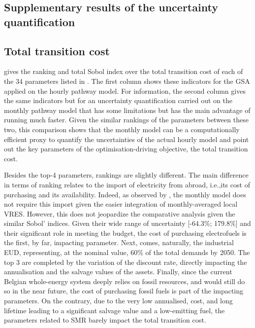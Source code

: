 \documentclass[11pt,twoside,a4paper,english]{article}
\def\ie{i.e.,}
\begin{document}
\begin{appendices}
\section{Supplementary results of the uncertainty quantification}

\subsection{Total transition cost}
\label{app:UQ_transition_cost}

 gives the ranking and total Sobol index over the total transition cost of each of the 34 parameters listed in . The first column shows these indicators for the \gls{GSA} applied on the hourly pathway model. For information, the second column gives the same indicators but for an uncertainty quantification carried out on the monthly pathway model that has some limitations \cite{limpens2024pathway} but has the main advantage of running much faster. Given the similar rankings of the parameters between these two, this comparison shows that the monthly model can be a computationally efficient proxy to quantify the uncertainties of the actual hourly model and point out the key parameters of the optimisation-driving objective, the total transition cost. 

Besides the top-4 parameters, rankings are slightly different. The main difference in terms of ranking relates to the import of electricity from abroad, \ie its cost of purchasing and its availability. Indeed, as observed by \citet{limpens2024pathway}, the monthly model does not require this import given the easier integration of monthly-averaged local \gls{VRES}. However, this does not jeopardize the comparative analysis given the similar Sobol' indices. Given their wide range of uncertainty [-64.3\%; 179.8\%] and their significant role in meeting the  budget, the cost of purchasing electrofuels is the first, by far, impacting parameter. Next, comes, naturally, the industrial \gls{EUD}, representing, at the nominal value, 60\% of the total demands by 2050. The top 3 are completed by the variation of the discount rate, directly impacting the annualisation and the salvage values of the assets. Finally, since the current Belgian whole-energy system deeply relies on fossil resources, and would still do so in the near future, the cost of purchasing fossil fuels is part of the impacting parameters. On the contrary, due to the very low annualised, cost, and long lifetime leading to a significant salvage value and a low-emitting fuel, the parameters related to \gls{SMR} barely impact the total transition cost.



\end{appendices}
\end{document}
